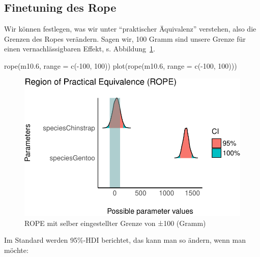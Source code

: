\documentclass[
  a4paper,
  DIV=11]{scrreprt}
\newenvironment{Shaded}{\begin{snugshade}}{\end{snugshade}}
\newcommand{\AttributeTok}[1]{\textcolor[rgb]{0.40,0.45,0.13}{#1}}
\newcommand{\DecValTok}[1]{\textcolor[rgb]{0.68,0.00,0.00}{#1}}
\newcommand{\FloatTok}[1]{\textcolor[rgb]{0.68,0.00,0.00}{#1}}
\newcommand{\FunctionTok}[1]{\textcolor[rgb]{0.28,0.35,0.67}{#1}}
\newcommand{\NormalTok}[1]{\textcolor[rgb]{0.00,0.23,0.31}{#1}}
\newcommand{\SpecialCharTok}[1]{\textcolor[rgb]{0.37,0.37,0.37}{#1}}
\theoremstyle{definition}
\theoremstyle{remark}
\begin{document}
\hypertarget{finetuning-des-rope}{%
\subsection{Finetuning des Rope}\label{finetuning-des-rope}}

Wir können festlegen, was wir unter ``praktischer Äquivalenz''
verstehen, also die Grenzen des Ropes verändern. Sagen wir, 100 Gramm
sind unsere Grenze für einen vernachlässigbaren Effekt, s.
Abbildung~\ref{fig-rope-range}.

\begin{Shaded}
\begin{Highlighting}[]
\FunctionTok{rope}\NormalTok{(m10}\FloatTok{.6}\NormalTok{, }\AttributeTok{range =} \FunctionTok{c}\NormalTok{(}\SpecialCharTok{{-}}\DecValTok{100}\NormalTok{, }\DecValTok{100}\NormalTok{))}
\FunctionTok{plot}\NormalTok{(}\FunctionTok{rope}\NormalTok{(m10}\FloatTok{.6}\NormalTok{, }\AttributeTok{range =} \FunctionTok{c}\NormalTok{(}\SpecialCharTok{{-}}\DecValTok{100}\NormalTok{, }\DecValTok{100}\NormalTok{)))}
\end{Highlighting}
\end{Shaded}

\begin{figure}[H]

{\centering \includegraphics{./metrische-AV_files/figure-pdf/fig-rope-range-1.pdf}

}

\caption{\label{fig-rope-range}ROPE mit selber eingestellter Grenze von
±100 (Gramm)}

\end{figure}

Im Standard werden 95\%-HDI berichtet, das kann man so ändern, wenn man
möchte:
\end{document}
